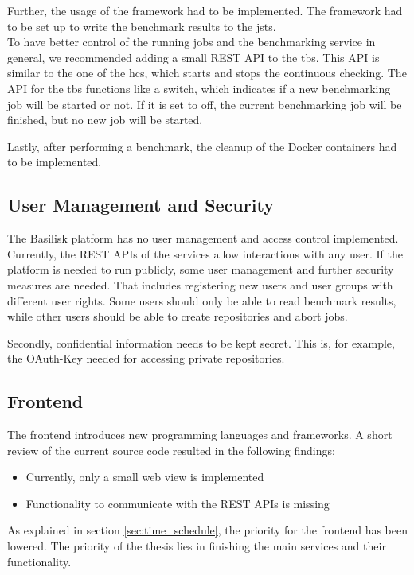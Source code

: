 Further, the usage of the \iguana{} framework had to be implemented.
The framework had to be set up to write the benchmark results to the \acl{jsts}.
\\

To have better control of the running jobs and the benchmarking service in general, we recommended adding a small REST API to the \ac{tbs}.
This API is similar to the one of the \ac{hcs}, which starts and stops the continuous checking.
The API for the \ac{tbs} functions like a switch, which indicates if a new benchmarking job will be started or not.
If it is set to off, the current benchmarking job will be finished, but no new job will be started.

Lastly, after performing a benchmark, the cleanup of the Docker containers had to be implemented.

\subsection{User Management and Security}
\label{sec:review_user_management}
The Basilisk platform has no user management and access control implemented.
Currently, the REST APIs of the services allow interactions with any user.
If the platform is needed to run publicly, some user management and further security measures are needed.
That includes registering new users and user groups with different user rights.
Some users should only be able to read benchmark results, while other users should be able to create repositories and abort jobs.

Secondly, confidential information needs to be kept secret.
This is, for example, the OAuth-Key needed for accessing private \gh{} repositories.


\newpage
\subsection{Frontend}
\label{sec:review_frontend}
The frontend introduces new programming languages and frameworks.
A short review of the current source code resulted in the following findings:
\begin{itemize}
	\item Currently, only a small web view is implemented
	\item Functionality to communicate with the REST APIs is missing
\end{itemize}


As explained in section \ref{sec:time_schedule}, the priority for the frontend has been lowered.
The priority of the thesis lies in finishing the main services and their functionality.

